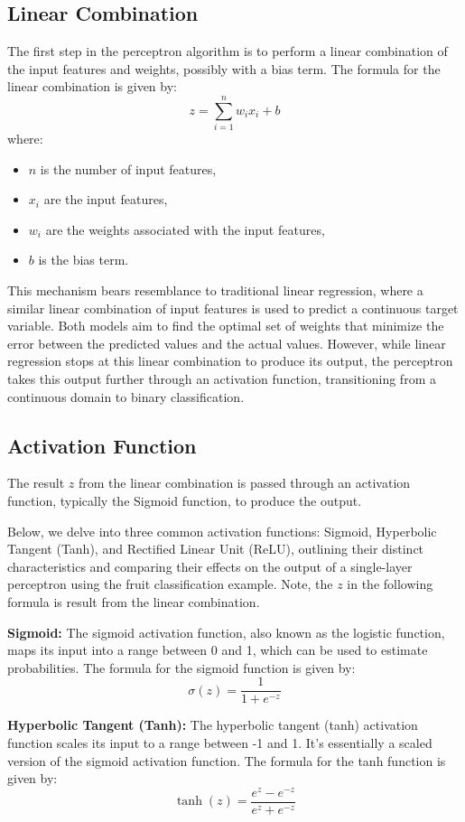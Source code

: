 \documentclass[10pt,twocolumn,letterpaper]{article}
\begin{document}
\subsection{Linear Combination}
The first step in the perceptron algorithm is to perform a linear combination of the input features and weights, possibly with a bias term. The formula for the linear combination is given by:
\[
   z = \sum_{i=1}^{n} w_i x_i + b
\]
where:
\begin{itemize}
   \item \( n \) is the number of input features,
   \item \( x_i \) are the input features,
   \item \( w_i \) are the weights associated with the input features,
   \item \( b \) is the bias term.
\end{itemize}
This mechanism bears resemblance to traditional linear regression, where a similar linear combination of input features is used to predict a continuous target variable. Both models aim to find the optimal set of weights that minimize the error between the predicted values and the actual values. However, while linear regression stops at this linear combination to produce its output, the perceptron takes this output further through an activation function, transitioning from a continuous domain to binary classification.

\subsection{Activation Function}
The result \( z \) from the linear combination is passed through an activation function, typically the Sigmoid function, to produce the output.

Below, we delve into three common activation functions: Sigmoid, Hyperbolic Tangent (Tanh), and Rectified Linear Unit (ReLU), outlining their distinct characteristics and comparing their effects on the output of a single-layer perceptron using the fruit classification example. Note, the \( z \) in the following formula is result from the linear combination.

\textbf{Sigmoid:}
The sigmoid activation function, also known as the logistic function, maps its input into a range between 0 and 1, which can be used to estimate probabilities. The formula for the sigmoid function is given by:
\[
   \sigma(z) = \frac{1}{{1 + e^{-z}}}
\]

\textbf{Hyperbolic Tangent (Tanh):}
The hyperbolic tangent (tanh) activation function scales its input to a range between -1 and 1. It's essentially a scaled version of the sigmoid activation function. The formula for the tanh function is given by:
\[
   \tanh(z) = \frac{{e^{z} - e^{-z}}}{{e^{z} + e^{-z}}}
\]
\end{document}
